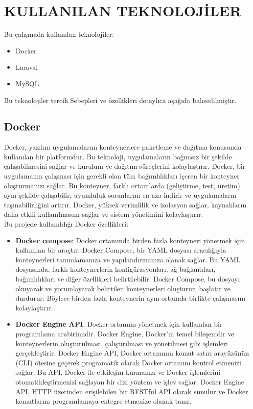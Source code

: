\section{KULLANILAN TEKNOLOJİLER}
Bu çalışmada kullanılan teknolojiler:
\begin{itemize}
  \item Docker
  \item Laraval
  \item MySQL
\end{itemize} 
Bu teknolojiler tercih Sebepleri ve özellikleri detaylıca aşağıda bahsedilmiştir.
\subsection{Docker}\label{subsec:docker}
Docker, yazılım uygulamalarını konteynerlere paketleme ve dağıtma konusunda kullanılan bir platformdur. Bu teknoloji, uygulamaların bağımsız bir şekilde çalışabilmesini sağlar ve kurulum ve dağıtım süreçlerini kolaylaştırır. Docker, bir uygulamanın çalışması için gerekli olan tüm bağımlılıkları içeren bir konteyner oluşturmanızı sağlar. Bu konteyner, farklı ortamlarda (geliştirme, test, üretim) aynı şekilde çalışabilir, uyumluluk sorunlarını en aza indirir ve uygulamaların taşınabilirliğini artırır. Docker, yüksek verimlilik ve izolasyon sağlar, kaynakların daha etkili kullanılmasını sağlar ve sistem yönetimini kolaylaştırır.\cite{docker}\\
Bu projede kullanıldığı Docker özellikleri:
\begin{itemize}
  \item \textbf{Docker compose}: Docker ortamında birden fazla konteyneri yönetmek için kullanılan bir araçtır. Docker Compose, bir YAML dosyası aracılığıyla konteynerleri tanımlamanıza ve yapılandırmanıza olanak sağlar. Bu YAML dosyasında, farklı konteynerlerin konfigürasyonları, ağ bağlantıları, bağımlılıkları ve diğer özellikleri belirtilebilir. Docker Compose, bu dosyayı okuyarak ve yorumlayarak belirtilen konteynerleri oluşturur, başlatır ve durdurur. Böylece birden fazla konteynerin aynı ortamda birlikte çalışmasını kolaylaştırır.
  \item \textbf{Docker Engine API}: Docker ortamını yönetmek için kullanılan bir programlama arabirimidir. Docker Engine, Docker'ın temel bileşenidir ve konteynerlerin oluşturulması, çalıştırılması ve yönetilmesi gibi işlemleri gerçekleştirir. Docker Engine API, Docker ortamının komut satırı arayüzünün (CLI) ötesine geçerek programatik olarak Docker ortamını kontrol etmenizi sağlar. Bu API, Docker ile etkileşim kurmanızı ve Docker işlemlerini otomatikleştirmenizi sağlayan bir dizi yöntem ve işlev sağlar. Docker Engine API, HTTP üzerinden erişilebilen bir RESTful API olarak sunulur ve Docker komutlarını programlamaya entegre etmenize olanak tanır. \cite{docker_api_reference}
\end{itemize}

